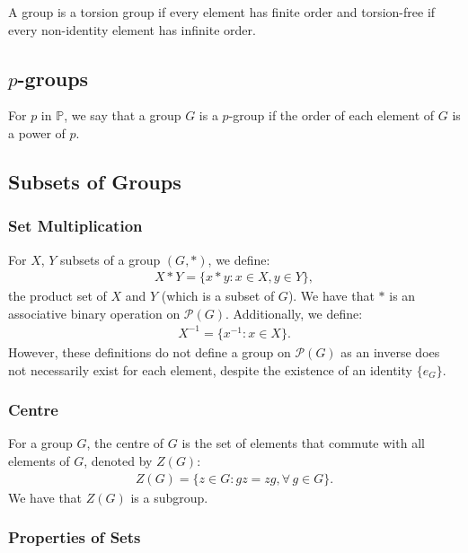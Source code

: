 A group is a torsion group if every element has finite order and torsion-free
if every non-identity element has infinite order.

\subsection{$p$-groups}

For $p$ in $\mathbb{P}$, we say that a group $G$ is a $p$-group if the order
of each element of $G$ is a power of $p$.

\newpage

\subsection{Subsets of Groups}

\subsubsection{Set Multiplication}

For $X$, $Y$ subsets of a group $(G, \ast)$, we define: \begin{align*}
    X \ast Y = \{x \ast y : x \in X, y \in Y\},
\end{align*} the product set of $X$ and $Y$ (which is a subset of $G$).
We have that $\ast$ is an associative binary operation on 
$\mathcal{P}(G)$. Additionally, we define: \begin{align*}
    X^{-1} = \{x^{-1} : x \in X\}.
\end{align*} However, these definitions do not define a group on
$\mathcal{P}(G)$ as an inverse does not necessarily exist for each
element, despite the existence of an identity $\{e_G\}$.

\subsubsection{Centre}

For a group $G$, the centre of $G$ is the set of elements that commute with all
elements of $G$, denoted by $Z(G)$: \begin{align*}
    Z(G) = \{z \in G : gz = zg, \forall \, g \in G\}.
\end{align*} We have that $Z(G)$ is a subgroup.

\subsubsection{Properties of Sets}

